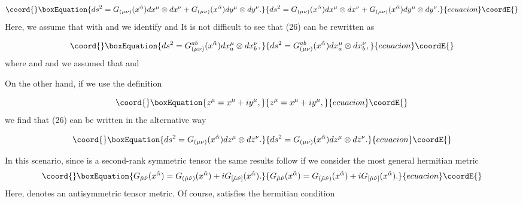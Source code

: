 \documentclass[a4paper,12pt]{article}
\begin{document}
\begin{equation}\coord{}\boxEquation{
ds^{2}=G_{(\mu \nu )}(x^{\hat{\alpha}})dx^{\mu }\otimes dx^{\nu }+G_{(\mu
\nu )}(x^{\hat{\alpha}})dy^{\mu }\otimes dy^{\nu }.  \label{26}
}{
ds^{2}=G_{(\mu \nu )}(x^{\hat{\alpha}})dx^{\mu }\otimes dx^{\nu }+G_{(\mu
\nu )}(x^{\hat{\alpha}})dy^{\mu }\otimes dy^{\nu }.  }{ecuacion}\coordE{}\end{equation}
Here, we assume that \coordHE{} with \coordHE{} and we
identify \coordHE{} and \coordHE{} It is not difficult to see that (26) can be rewritten as

\begin{equation}\coord{}\boxEquation{
ds^{2}=G_{(\mu \nu )}^{ab}(x^{\hat{\alpha}})dx_{a}^{\mu }\otimes dx_{b}^{\nu
},  \label{27}
}{
ds^{2}=G_{(\mu \nu )}^{ab}(x^{\hat{\alpha}})dx_{a}^{\mu }\otimes dx_{b}^{\nu
},  }{ecuacion}\coordE{}\end{equation}
where \coordHE{} and \coordHE{} and we
assumed that \coordHE{} and \coordHE{}

On the other hand, if we use the definition

\begin{equation}\coord{}\boxEquation{
z^{\mu }=x^{\mu }+iy^{\mu },  \label{28}
}{
z^{\mu }=x^{\mu }+iy^{\mu },  }{ecuacion}\coordE{}\end{equation}
we find that (26) can be written in the alternative way

\begin{equation}\coord{}\boxEquation{
ds^{2}=G_{(\mu \nu )}(x^{\hat{\alpha}})dz^{\mu }\otimes d\bar{z}^{\nu }.
\label{29}
}{
ds^{2}=G_{(\mu \nu )}(x^{\hat{\alpha}})dz^{\mu }\otimes d\bar{z}^{\nu }.
}{ecuacion}\coordE{}\end{equation}

In this scenario, since \coordHE{} is a
second-rank symmetric tensor the same results follow if we consider the most
general hermitian metric 
\begin{equation}\coord{}\boxEquation{
G_{\hat{\mu}\hat{\nu}}(x^{\hat{\alpha}})=G_{(\hat{\mu}\hat{\nu})}(x^{\hat{
\alpha}})+iG_{[\hat{\mu}\hat{\nu}]}(x^{\hat{\alpha}}).  \label{30}
}{
G_{\hat{\mu}\hat{\nu}}(x^{\hat{\alpha}})=G_{(\hat{\mu}\hat{\nu})}(x^{\hat{
\alpha}})+iG_{[\hat{\mu}\hat{\nu}]}(x^{\hat{\alpha}}).  }{ecuacion}\coordE{}\end{equation}
Here, \coordHE{} denotes an antisymmetric tensor metric. Of
course, \coordHE{} satisfies the hermitian condition \coordHE{}
\end{document}
